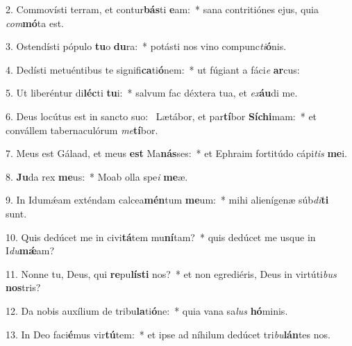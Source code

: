 2. Commovísti terram, et contur\textbf{bás}ti \textbf{e}am:~*  sana contritiónes ejus, quia \textit{com}\textbf{mó}ta est.\

3. Ostendísti pópulo \textbf{tu}o \textbf{du}ra:~*  potásti nos vino compunc\textit{ti}\textbf{ó}nis.\

4. Dedísti metuéntibus te signifi\textbf{ca}ti\textbf{ó}nem:~*  ut fúgiant a fáci\textit{e} \textbf{ar}cus:\

5. Ut liberéntur di\textbf{léc}ti \textbf{tu}i:~*  salvum fac déxtera tua, et \textit{ex}\textbf{áu}di me.\

6. Deus locútus est in sancto suo: \dag\  Lætábor, et par\textbf{tí}bor \textbf{Sí}\textbf{chi}mam:~*  et convállem tabernaculórum \textit{me}\textbf{tí}bor.\

7. Meus est Gálaad, et meus \textbf{est} Ma\textbf{nás}ses:~*  et Ephraim fortitúdo cápi\textit{tis} \textbf{me}i.\

8. \textbf{Ju}da rex \textbf{me}us:~*  Moab olla spe\textit{i} \textbf{me}æ.\

9. In Idumǽam exténdam calcea\textbf{mén}tum \textbf{me}um:~*  mihi alienígenæ súb\textit{di}\textbf{ti} sunt.\

10. Quis dedúcet me in civi\textbf{tá}tem mu\textbf{ní}tam?~*  quis dedúcet me usque in I\textit{du}\textbf{mǽ}am?\

11. Nonne tu, Deus, qui \textbf{re}pu\textbf{lís}\textbf{ti} nos?~*  et non egrediéris, Deus in virtúti\textit{bus} \textbf{nos}tris?\

12. Da nobis auxílium de tribu\textbf{la}ti\textbf{ó}ne:~*  quia vana sa\textit{lus} \textbf{hó}minis.\

13. In Deo faci\textbf{é}mus vir\textbf{tú}tem:~*  et ipse ad níhilum dedúcet tri\textit{bu}\textbf{lán}tes nos.\

